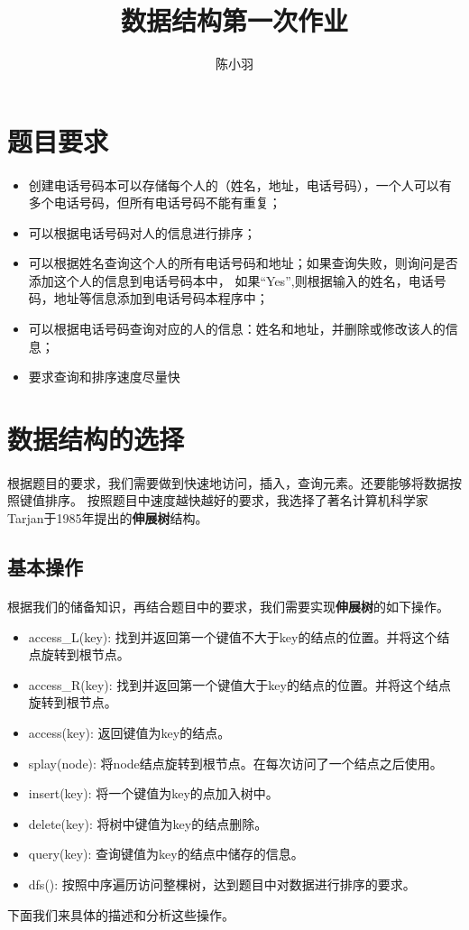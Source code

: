 \documentclass{article}
\title{数据结构第一次作业}
\author{陈小羽}
\date{}
\begin{document}
\maketitle
\tableofcontents
\section{题目要求}
	\paragraph{}
		\begin{itemize}
			\item 创建电话号码本可以存储每个人的（姓名，地址，电话号码），一个人可以有多个电话号码，但所有电话号码不能有重复；
			\item 可以根据电话号码对人的信息进行排序；
			\item 可以根据姓名查询这个人的所有电话号码和地址；如果查询失败，则询问是否添加这个人的信息到电话号码本中，
			如果``Yes'',则根据输入的姓名，电话号码，地址等信息添加到电话号码本程序中；
			\item 可以根据电话号码查询对应的人的信息：姓名和地址，并删除或修改该人的信息；
			\item 要求查询和排序速度尽量快
		\end{itemize}
\section{数据结构的选择}
	\paragraph{}
		根据题目的要求，我们需要做到快速地访问，插入，查询元素。还要能够将数据按照键值排序。
		按照题目中速度越快越好的要求，我选择了著名计算机科学家Tarjan于1985年提出的\textbf{伸展树}结构。
\subsection{基本操作}
	\paragraph{}
		根据我们的储备知识，再结合题目中的要求，我们需要实现\textbf{伸展树}的如下操作。
		\begin{itemize}
			\item access\_L(key): 找到并返回第一个键值不大于key的结点的位置。并将这个结点旋转到根节点。
			\item access\_R(key): 找到并返回第一个键值大于key的结点的位置。并将这个结点旋转到根节点。
			\item access(key): 返回键值为key的结点。
			\item splay(node): 将node结点旋转到根节点。在每次访问了一个结点之后使用。
			\item insert(key): 将一个键值为key的点加入树中。
			\item delete(key): 将树中键值为key的结点删除。
			\item query(key): 查询键值为key的结点中储存的信息。
			\item dfs(): 按照中序遍历访问整棵树，达到题目中对数据进行排序的要求。
		\end{itemize}
		下面我们来具体的描述和分析这些操作。
\end{document}
